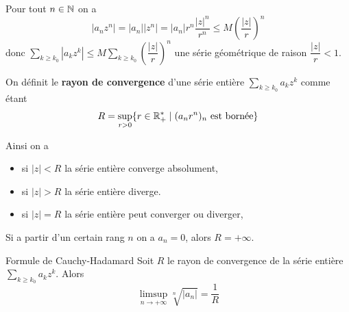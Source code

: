 \documentclass[a4paper,12pt]{article}
\begin{document}
\begin{demonstration}
    Pour tout $n \in \mathbb{N}$ on a
    $$
    |a_n z^n| = |a_n| |z^n| = |a_n| r^n \frac{|z|^n}{r^n} \leq M \left(\frac{|z|}{r}\right)^n
    $$
    donc $\sum\limits_{k \geq k_0} |a_k z^k| \leq M \sum\limits_{k \geq k_0} \left(\dfrac{|z|}{r}\right)^n$ une série géométrique de raison $\dfrac{|z|}{r} < 1$.
\end{demonstration}

\begin{definition}
    On définit le \textbf{rayon de convergence} d'une série entière $\sum\limits_{k \geq k_0} a_k z^k$ comme étant
    $$
    R = \sup_{r > 0} \{ r \in \mathbb{R}_+^* \mid (a_n r^n)_n \text{ est bornée}\}
    $$
\end{definition}

\begin{remarque}
    Ainsi on a
    \begin{itemize}
        \item si $|z| < R$ la série entière converge absolument,
        \item si $|z| > R$ la série entière diverge.
        \item si $|z| = R$ la série entière peut converger ou diverger,
    \end{itemize}
\end{remarque}

\begin{remarque}
    Si a partir d'un certain rang $n$ on a $a_n = 0$, alors $R = +\infty$.
\end{remarque}

\begin{theoreme}{Formule de Cauchy-Hadamard}{}
    Soit $R$ le rayon de convergence de la série entière $\sum\limits_{k \geq k_0} a_k z^k$. Alors
    $$
    \limsup_{n \to +\infty} \sqrt[n]{|a_n|} = \frac{1}{R}
    $$
\end{theoreme}
\end{document}
